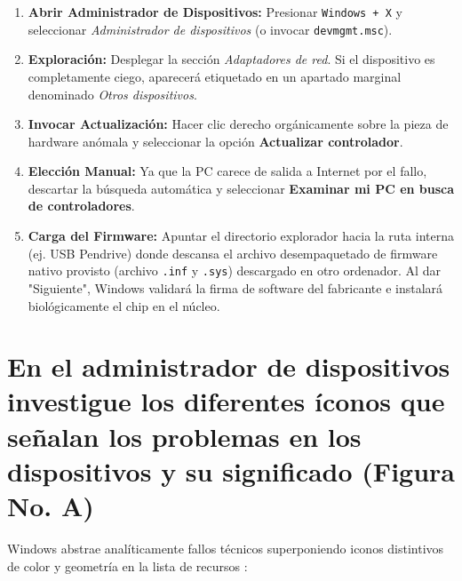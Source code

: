 \documentclass[a4paper,12pt]{article}
\begin{document}
\begin{enumerate}
    \item \textbf{Abrir Administrador de Dispositivos:} Presionar \texttt{Windows + X} y seleccionar \textit{Administrador de dispositivos} (o invocar \texttt{devmgmt.msc}).
    \item \textbf{Exploración:} Desplegar la sección \textit{Adaptadores de red}. Si el dispositivo es completamente ciego, aparecerá etiquetado en un apartado marginal denominado \textit{Otros dispositivos}.
    \item \textbf{Invocar Actualización:} Hacer clic derecho orgánicamente sobre la pieza de hardware anómala y seleccionar la opción \textbf{Actualizar controlador}.
    \item \textbf{Elección Manual:} Ya que la PC carece de salida a Internet por el fallo, descartar la búsqueda automática y seleccionar \textbf{Examinar mi PC en busca de controladores}.
    \item \textbf{Carga del Firmware:} Apuntar el directorio explorador hacia la ruta interna (ej. USB Pendrive) donde descansa el archivo desempaquetado de firmware nativo provisto (archivo \texttt{.inf} y \texttt{.sys}) descargado en otro ordenador. Al dar "Siguiente", Windows validará la firma de software del fabricante e instalará biológicamente el chip en el núcleo.
\end{enumerate}

\section{En el administrador de dispositivos investigue los diferentes íconos que señalan los problemas en los dispositivos y su significado (Figura No. A)}

Windows abstrae analíticamente fallos técnicos superponiendo iconos distintivos de color y geometría en la lista de recursos \cite{ref83}:
\end{document}
